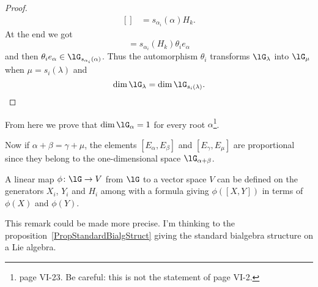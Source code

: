 \begin{proof}
\begin{equation}
\begin{aligned}[]
			                           & =s_{\alpha_i}(\alpha)H_k.
		\end{aligned}
	\end{equation}
	At the end we got
	\begin{equation}
		[H_k,\theta_ie_{\alpha}]=s_{\alpha_i}(H_k)\theta_ie_{\alpha}
	\end{equation}
	and then \( \theta_ie_{\alpha}\in\lG_{s_{\alpha_i}(\alpha)}\). Thus the automorphism \( \theta_i\) transforms \( \lG_{\lambda}\) into \( \lG_{\mu}\) when \( \mu=s_i(\lambda)\) and
	\begin{equation}
		\dim\lG_{\lambda}=\dim\lG_{s_i(\lambda)}.
	\end{equation}
\end{proof}
From here we prove that \( \dim\lG_{\alpha}=1\) for every root \( \alpha\)\footnote{\cite{SerreSSAlgebres} page VI-23. Be careful: this is not the statement of page VI-2.}.

Now if \( \alpha+\beta=\gamma+\mu\), the elements \( [E_{\alpha},E_{\beta}]\) and \( [E_{\gamma},E_{\mu}]\) are proportional since they belong to the one-dimensional space \( \lG_{\alpha+\beta}\).


\begin{remark}      \label{RemChevDefmapCommXH}
	A linear map \( \phi\colon \lG\to V\) from \( \lG\) to a vector space \( V\) can be defined on the generators \( X_i\), \( Y_i\) and \( H_i\) among with a formula giving \( \phi([X,Y])\) in terms of \( \phi(X)\) and \( \phi(Y)\).
\end{remark}

\begin{probleme}
	This remark could be made more precise. I'm thinking to the proposition~\ref{PropStandardBialgStruct} giving the standard bialgebra structure on a Lie algebra.
\end{probleme}

